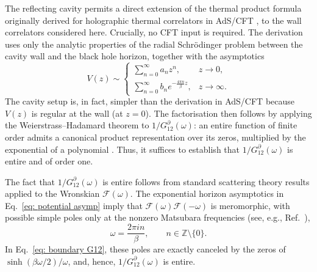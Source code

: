 \documentclass[prd,aps,twocolumn,amsfonts,showpacs,superscriptaddress,preprintnumbers,nofootinbib]{revtex4-2}
\begin{document}
The reflecting cavity permits a direct extension of the thermal product formula originally derived for holographic thermal correlators in AdS/CFT \cite{Dodelson:2023vrw}, to the wall correlators considered here. Crucially, no CFT input is required. The derivation uses only the analytic properties of the radial Schr\"odinger problem between the cavity wall and the black hole horizon, together with the asymptotics
\begin{equation}
\label{eq: potential asymp}
    V(z) \sim
    \begin{cases}
        \sum_{n=0}^{\infty} a_n z^n, & z \to 0 , \\[2mm]
        \sum_{n=0}^{\infty} b_n e^{-\frac{4 \pi n}{\beta}z}, & z \to \infty .
    \end{cases}
\end{equation}
The cavity setup is, in fact, simpler than the derivation in AdS/CFT because $V(z)$ is regular at the wall (at $z=0$). The factorisation then follows by applying the Weierstrass--Hadamard theorem to $1/G_{12}^{\partial}(\omega)$: an entire function of finite order admits a canonical product representation over its zeros, multiplied by the exponential of a polynomial \cite{book}. Thus, it suffices to establish that $1/G_{12}^{\partial}(\omega)$ is entire and of order one. 

The fact that $1/G_{12}^{\partial}(\omega)$ is entire follows from standard scattering theory results applied to the Wronskian $\mathcal F(\omega)$. The exponential horizon asymptotics in Eq.~\eqref{eq: potential asymp} imply that $\mathcal{F}(\omega)\mathcal{F}(-\omega)$ is meromorphic, with possible simple poles only at the nonzero Matsubara frequencies (see, e.g., Ref.~\cite{Newton:1982qc}),
\begin{equation}
     \omega=\frac{2\pi i n}{\beta},
    \qquad n\in\mathbb{Z}\setminus\{0\}.
\end{equation}
In Eq.~\eqref{eq: boundary G12}, these poles are exactly canceled by the zeros of $\sinh(\beta\omega/2)/\omega$, and, hence, $1/G_{12}^{\partial}(\omega)$ is entire.
\end{document}
